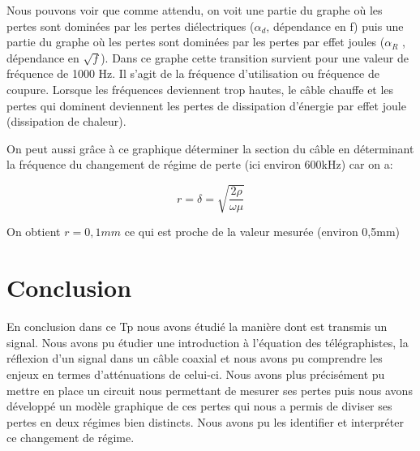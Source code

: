 \documentclass[12pt,a4paper, french]{article}
\begin{document}
    Nous pouvons voir que comme attendu, on voit une partie du graphe où 
    les pertes sont dominées par les pertes diélectriques ($\alpha _d$, dépendance en f) puis une 
    partie du graphe où les pertes sont dominées par les pertes par effet joules ($\alpha_R$ , 
    dépendance en $\sqrt{f}$). Dans ce graphe cette transition survient pour une valeur de 
    fréquence de 1000 Hz. Il s'agit de la fréquence d'utilisation ou fréquence de coupure.
    Lorsque les fréquences deviennent trop hautes, le câble chauffe et les pertes qui 
    dominent deviennent les pertes de dissipation d'énergie par effet joule 
    (dissipation de chaleur).
    
    On peut aussi grâce à ce graphique déterminer la section du câble en déterminant la fréquence du 
    changement de régime de perte (ici environ 600kHz) car on a:
    \begin{center}
    \begin{equation*}
        r=\delta =\sqrt{\frac{2\rho }{\omega \mu }}
    \end{equation*}
    \end{center}
    
    On obtient $r=0,1mm$ ce qui est proche de la valeur mesurée (environ 0,5mm)
    
    \section*{Conclusion}
    
    En conclusion dans ce Tp nous avons étudié la manière dont est 
    transmis un signal. Nous avons pu étudier une introduction à l'équation des 
    télégraphistes, la réflexion d'un signal dans un câble coaxial et nous avons 
    pu comprendre les enjeux en termes d'atténuations de celui-ci. Nous avons plus
    précisément pu mettre en place un circuit nous permettant de mesurer ses pertes 
    puis nous avons développé un modèle graphique de ces pertes qui nous a permis de
    diviser ses pertes en deux régimes bien distincts. Nous avons pu les identifier 
    et interpréter ce changement de régime. 
\end{document}
